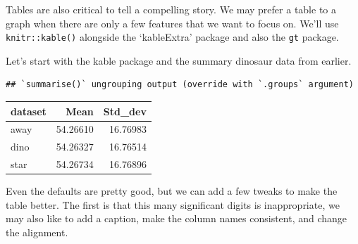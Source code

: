 \documentclass[
]{book}
\newenvironment{Shaded}{\begin{snugshade}}{\end{snugshade}}
\newcommand{\DataTypeTok}[1]{\textcolor[rgb]{0.13,0.29,0.53}{#1}}
\newcommand{\KeywordTok}[1]{\textcolor[rgb]{0.13,0.29,0.53}{\textbf{#1}}}
\newcommand{\NormalTok}[1]{#1}
\newcommand{\OperatorTok}[1]{\textcolor[rgb]{0.81,0.36,0.00}{\textbf{#1}}}
\newcommand{\StringTok}[1]{\textcolor[rgb]{0.31,0.60,0.02}{#1}}
\begin{document}
Tables are also critical to tell a compelling story. We may prefer a table to a graph when there are only a few features that we want to focus on. We'll use \texttt{knitr::kable()} alongside the `kableExtra' package and also the \texttt{gt} package.

Let's start with the kable package and the summary dinosaur data from earlier.

\begin{Shaded}
\end{Shaded}

\begin{verbatim}
## `summarise()` ungrouping output (override with `.groups` argument)
\end{verbatim}

\begin{Shaded}
\end{Shaded}

\begin{tabular}{l|r|r}
\hline
dataset & Mean & Std\_dev\\
\hline
away & 54.26610 & 16.76983\\
\hline
dino & 54.26327 & 16.76514\\
\hline
star & 54.26734 & 16.76896\\
\hline
\end{tabular}

Even the defaults are pretty good, but we can add a few tweaks to make the table better. The first is that this many significant digits is inappropriate, we may also like to add a caption, make the column names consistent, and change the alignment.
\end{document}

